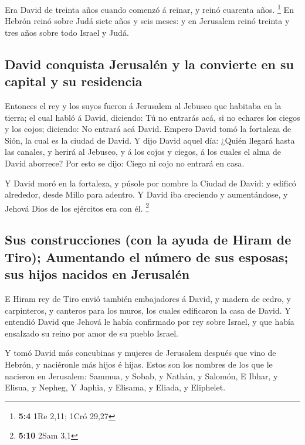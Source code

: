  Era David de treinta años cuando comenzó á reinar, y reinó
cuarenta años. \footnote{\textbf{5:4} 1Re 2,11; 1Cró 29,27} 
En Hebrón reinó sobre Judá siete años y seis meses: y en Jerusalem reinó
treinta y tres años sobre todo Israel y Judá.

\hypertarget{david-conquista-jerusaluxe9n-y-la-convierte-en-su-capital-y-su-residencia}{%
\subsection{David conquista Jerusalén y la convierte en su capital y su
residencia}\label{david-conquista-jerusaluxe9n-y-la-convierte-en-su-capital-y-su-residencia}}

 Entonces el rey y los suyos fueron á Jerusalem al Jebuseo
que habitaba en la tierra; el cual habló á David, diciendo: Tú no
entrarás acá, si no echares los ciegos y los cojos; diciendo: No entrará
acá David.  Empero David tomó la fortaleza de Sión, la cual
es la ciudad de David.  Y dijo David aquel día: ¿Quién
llegará hasta las canales, y herirá al Jebuseo, y á los cojos y ciegos,
á los cuales el alma de David aborrece? Por esto se dijo: Ciego ni cojo
no entrará en casa.

 Y David moró en la fortaleza, y púsole por nombre la Ciudad
de David: y edificó alrededor, desde Millo para adentro.  Y
David iba creciendo y aumentándose, y Jehová Dios de los ejércitos era
con él. \footnote{\textbf{5:10} 2Sam 3,1}

\hypertarget{sus-construcciones-con-la-ayuda-de-hiram-de-tiro-aumentando-el-nuxfamero-de-sus-esposas-sus-hijos-nacidos-en-jerusaluxe9n}{%
\subsection{Sus construcciones (con la ayuda de Hiram de Tiro);
Aumentando el número de sus esposas; sus hijos nacidos en
Jerusalén}\label{sus-construcciones-con-la-ayuda-de-hiram-de-tiro-aumentando-el-nuxfamero-de-sus-esposas-sus-hijos-nacidos-en-jerusaluxe9n}}

 E Hiram rey de Tiro envió también embajadores á David, y
madera de cedro, y carpinteros, y canteros para los muros, los cuales
edificaron la casa de David.  Y entendió David que Jehová
le había confirmado por rey sobre Israel, y que había ensalzado su reino
por amor de su pueblo Israel.

 Y tomó David más concubinas y mujeres de Jerusalem después
que vino de Hebrón, y naciéronle más hijos é hijas.  Estos
son los nombres de los que le nacieron en Jerusalem: Sammua, y Sobab, y
Nathán, y Salomón,  E Ibhar, y Elisua, y Nepheg,
 Y Japhia, y Elisama, y Eliada, y Eliphelet.


